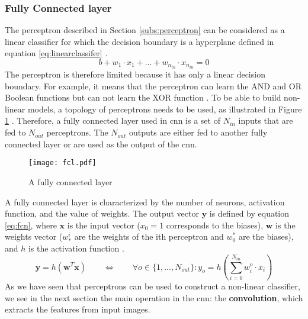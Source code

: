 \subsubsection{Fully Connected layer} \label{subs:fcl}
The perceptron described in Section \ref{subs:perceptron} can be considered as a linear classifier for which the decision boundary is a hyperplane defined in equation \eqref{eq:linearclassifer} \cite{matteucci_artificial_2019}.
%
\begin{equation}
    b + w_1 \cdot x_1 + ... + w_{n_{in}} \cdot x_{n_{in}} = 0
    \label{eq:linearclassifer}
\end{equation}
%
The perceptron is therefore limited because it has only a linear decision boundary. For example, it means that the perceptron can learn the AND and OR Boolean functions but can not learn the XOR function \cite{minsky_perceptrons_1969}. To be able to build non-linear models, a topology of perceptrons needs to be used, as illustrated in Figure \ref{fig:fcn} \cite{khan_survey_2020}. Therefore, a fully connected layer used in \acrshort{cnn} is a set of $N_{in}$ inputs that are fed to $N_{out}$ perceptrons. The $N_{out}$ outputs are either fed to another fully connected layer or are used as the output of the \acrshort{cnn}.
%
\begin{figure}[H]
    \centering
    \texttt{[image: fcl.pdf]}
    \caption{A fully connected layer}
    \label{fig:fcn}
\end{figure}
%
A fully connected layer is characterized by the number of neurons, activation function, and the value of weights. The output vector $\boldsymbol{y}$ is defined by equation \eqref{eq:fcn}, where $\boldsymbol{x}$ is the input vector ($x_0 = 1$ corresponds to the biases), $\boldsymbol{w}$ is the weights vector ($w^i_*$ are the weights of the ith perceptron and $w^*_0$ are the biases), and $h$ is the activation function \cite{abdelouahab_accelerating_2018}.
%
\begin{equation}
    \boldsymbol{y} = h(\boldsymbol{w}^T \boldsymbol{x}) \qquad \Leftrightarrow \qquad \forall o \in \{ 1, ..., N_{out} \} : y_o = h(\sum^{N_{in}}_{i=0} w^o_i \cdot x_i)
    \label{eq:fcn}
\end{equation}
%
As we have seen that perceptrons can be used to construct a non-linear classifier, we see in the next section the main operation in the \acrshort{cnn}: the \textbf{convolution}, which extracts the features from input images.
